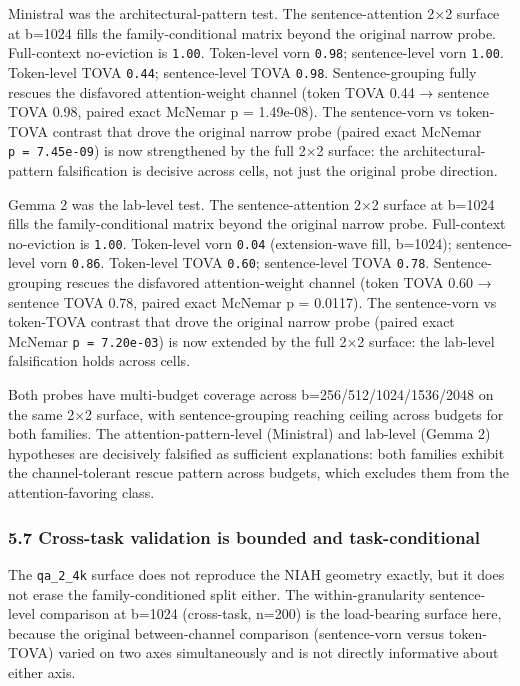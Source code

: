 \documentclass[
]{article}
\begin{document}
Ministral was the architectural-pattern test. The sentence-attention
2×2 surface at b=1024 fills the family-conditional matrix beyond the
original narrow probe. Full-context no-eviction is \texttt{1.00}.
Token-level vorn \texttt{0.98}; sentence-level vorn \texttt{1.00}.
Token-level TOVA \texttt{0.44}; sentence-level TOVA \texttt{0.98}.
Sentence-grouping fully rescues the disfavored attention-weight channel
(token TOVA 0.44 → sentence TOVA 0.98, paired exact McNemar p =
1.49e-08). The
sentence-vorn vs token-TOVA contrast that drove the original narrow
probe (paired exact McNemar \texttt{p\ =\ 7.45e-09}) is now strengthened
by the full 2×2 surface: the architectural-pattern falsification is
decisive across cells, not just the original probe direction.

Gemma 2 was the lab-level test. The sentence-attention 2×2 surface at
b=1024 fills the family-conditional matrix beyond the original narrow
probe. Full-context no-eviction is \texttt{1.00}. Token-level vorn
\texttt{0.04} (extension-wave fill, b=1024); sentence-level vorn
\texttt{0.86}. Token-level TOVA \texttt{0.60}; sentence-level TOVA
\texttt{0.78}. Sentence-grouping
rescues the disfavored attention-weight channel (token TOVA 0.60 →
sentence
TOVA 0.78, paired exact McNemar p = 0.0117). The sentence-vorn vs
token-TOVA contrast that drove the original narrow probe (paired exact
McNemar \texttt{p\ =\ 7.20e-03}) is now extended by the full 2×2
surface: the lab-level falsification holds across cells.

Both probes have multi-budget coverage across b=256/512/1024/1536/2048
on the same 2$\times$2 surface, with sentence-grouping reaching ceiling
across budgets for both families. The attention-pattern-level
(Ministral) and lab-level (Gemma 2) hypotheses are decisively
falsified as sufficient explanations: both families exhibit the
channel-tolerant rescue pattern across budgets, which excludes them
from the attention-favoring class.

\subsubsection{5.7 Cross-task validation is bounded and
task-conditional}\label{57-cross-task-validation-is-bounded-and-task-conditional}

The \texttt{qa\_2\_4k} surface does not reproduce the NIAH geometry
exactly, but it does not erase the family-conditioned split either. The
within-granularity sentence-level comparison at b=1024 (cross-task, n=200)
is the load-bearing surface here, because the original between-channel
comparison (sentence-vorn versus token-TOVA) varied on two axes
simultaneously and is not directly informative about either axis.
\end{document}
